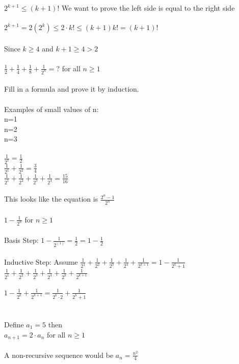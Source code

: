 \documentclass{article}
\begin{document}
\begin{flushleft}
$2^{k+1} \leq (k+1)!$ We want to prove the left side is equal to the right side\\
~\\
$2^{k+1} = 2(2^k) \leq 2 \cdot k! \leq (k+1)k! = (k+1)!$ \\
~\\
Since $k \geq 4 $ and $ k+1 \geq 4 > 2$ \\
~\\
$\frac{1}{2} + \frac{1}{4} + \frac{1}{8} + \frac{1}{2^n} = ?$ for all $n \geq 1$ \\
~\\
Fill in a formula and prove it by induction. \\
~\\
Examples of small values of n:  \\
n=1 \\
n=2 \\
n=3\\
~\\
$\frac{1}{2^1} = \frac{1}{2}$ \\
$\frac{1}{2^1} + \frac{1}{2^2} = \frac{3}{4}$ \\
$\frac{1}{2^1} + \frac{1}{2^2} + \frac{1}{2^3} + \frac{1}{2^4} = \frac{15}{16}$ \\
~\\
This looks like the equation is $\frac{2^n-1}{2^n}$ \\
~\\
$1 - \frac{1}{2^n}$ for $n \geq 1$ \\
~\\
Basis Step: $1 - \frac{1}{2^{(1)}} = \frac{1}{2} = 1 - \frac{1}{2}$ \\
~\\
Inductive Step: Assume $\frac{1}{2^1} + \frac{1}{2^2} + \frac{1}{2^3} + \frac{1}{2^4} + \frac{1}{2^{k+1}}= 1 - \frac{1}{2^k+1}$
~\\
$\frac{1}{2^1} + \frac{1}{2^2} + \frac{1}{2^3} + \frac{1}{2^4} + \frac{1}{2^k} + \frac{1}{2^{k+1}}$ \\
~\\
$1 - \frac{1}{2^k} + \frac{1}{2^{k+1}} = \frac{1}{2^k \cdot 2} + \frac{1}{2^k+1}$ \\
~\\
~\\
Define $a_1 = 5$ then \\
$a_{n+1} = 2\cdot a_n$ for all $n \geq 1$ \\
~\\
A non-recursive sequence would be $a_n = \frac{n^2}{4}$ \\

\end{flushleft}
\end{document}
